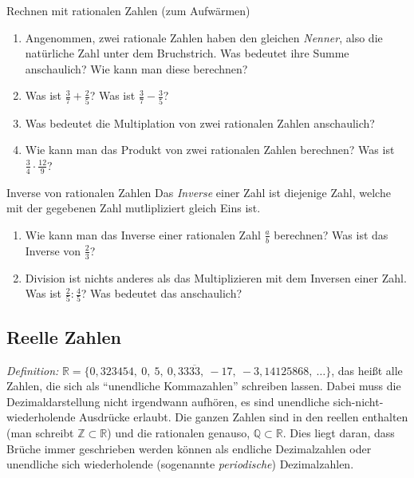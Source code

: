 \documentclass{zirkelblatt1415}
\newcommand{\RR}{\mathbb{R}}
\newcommand{\ZZ}{\mathbb{Z}}
\newcommand{\QQ}{\mathbb{Q}}
\newcommand{\ol}[1]{\overline{#1}}
\begin{document}
\begin{aufgabe}{Rechnen mit rationalen Zahlen (zum Aufwärmen)}
  \begin{enumerate}
    \item Angenommen, zwei rationale Zahlen haben den gleichen \emph{Nenner}, also die natürliche Zahl unter dem Bruchstrich. Was bedeutet ihre Summe anschaulich? Wie kann man diese berechnen?
		\item Was ist $\frac{3}{7}+\frac{2}{5}$? Was ist $\frac{3}{7}-\frac{3}{5}$?
    \item Was bedeutet die Multiplation von zwei rationalen Zahlen anschaulich?
		\item Wie kann man das Produkt von zwei rationalen Zahlen berechnen? Was ist $\frac{3}{4}\cdot\frac{12}{9}$?
  \end{enumerate}
\end{aufgabe}



\begin{aufgabe}{Inverse von rationalen Zahlen}
Das \emph{Inverse} einer Zahl ist diejenige Zahl, welche mit der gegebenen Zahl mutlipliziert gleich Eins ist. 
\begin{enumerate}
  \item Wie kann man das Inverse einer rationalen Zahl $\frac{a}{b}$ berechnen? Was ist das Inverse von $\frac{2}{3}$?  
  \item Division ist nichts anderes als das Multiplizieren mit dem Inversen einer Zahl. Was ist $\frac{2}{5}:\frac{4}{5}$? Was bedeutet das anschaulich?
\end{enumerate}
\end{aufgabe}




\subsection{Reelle Zahlen}

\emph{Definition:} $\RR=\{0{,}323454,\ 0,\ 5,\ 0{,}33\ol{33},\ -17,\ -3{,}14125868,\ \ldots\}$, das heißt alle Zahlen, die sich als "`unendliche Kommazahlen"' %
schreiben lassen. Dabei muss die Dezimaldarstellung nicht irgendwann aufhören, es sind unendliche sich-nicht-wiederholende Ausdrücke erlaubt. Die ganzen Zahlen sind in den reellen enthalten (man schreibt $\ZZ\subset\RR$) und die rationalen genauso, $\QQ\subset\RR$. Dies liegt daran, dass Brüche immer geschrieben werden können als endliche Dezimalzahlen oder unendliche sich wiederholende (sogenannte \emph{periodische}) Dezimalzahlen.
\end{document}
